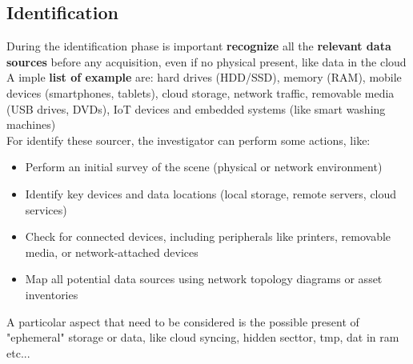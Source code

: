 \subsection{Identification}
During the identification phase is important \textbf{recognize} all the \textbf{relevant data sources} before any acquisition, even if no physical present, like data in the cloud \\ A imple \textbf{list of example} are: hard drives (HDD/SSD), memory (RAM), mobile devices (smartphones, tablets), cloud storage, network traffic, removable media (USB drives, DVDs), IoT devices and embedded systems (like smart washing machines) \\
\bigskip For identify these sourcer, the investigator can perform some actions, like:
\begin{itemize}[itemsep=0pt]

  \item Perform an initial survey of the scene (physical or network environment)

  \item Identify key devices and data locations (local storage, remote servers, cloud services)

  \item Check for connected devices, including peripherals like printers, removable media, or network-attached devices

  \item Map all potential data sources using network topology diagrams or asset inventories

\end{itemize}

A particolar aspect that need to be considered is the possible present of "ephemeral" storage or data, like cloud syncing, hidden secttor, tmp, dat in ram etc...

